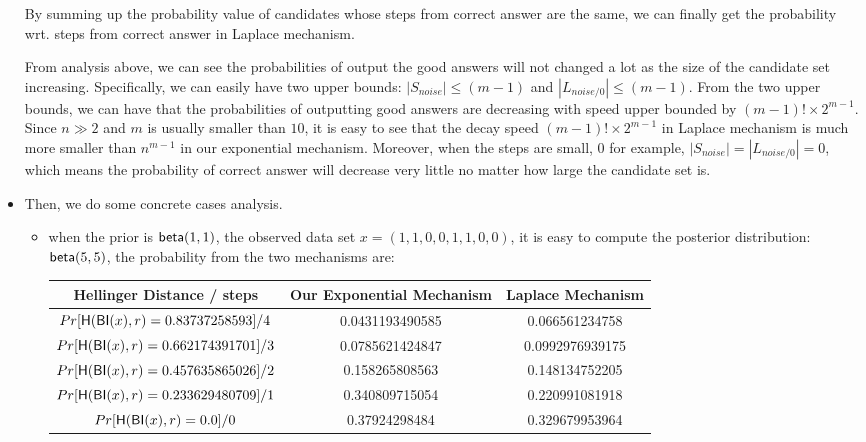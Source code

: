 \begin{itemize}
	By summing up the probability value of candidates whose steps from correct answer are the same, we can finally get the probability wrt. steps from correct answer in Laplace mechanism.

	From analysis above, we can see the probabilities of output the good answers will not changed a lot as the size of the candidate set increasing. Specifically, we can easily have two upper bounds: $|S_{noise}| \leq (m-1)$ and $|L_{noise/0}| \leq (m-1)$. From the two upper bounds, we can have that the probabilities of outputting good answers are decreasing with speed upper bounded by $(m-1)! \times 2^{m-1}$. Since $n \gg 2$ and $m$ is usually smaller than $10$, it is easy to see that the decay speed $(m-1)! \times 2^{m-1}$ in Laplace mechanism is much more smaller than $n^{m-1}$ in our exponential mechanism. Moreover, when the steps are small, $0$ for example, $|S_{noise}| = |L_{noise/0}|  = 0$, which means the probability of correct answer will decrease very little no matter how large the candidate set is. 

	\item Then, we do some concrete cases analysis.

	\begin{itemize}

		\item when the prior is $\mathsf{beta}(1,1)$, the observed data set $x = (1,1,0,0,1,1,0,0)$, it is easy to compute the posterior distribution: $\mathsf{beta}(5,5)$, the probability from the two mechanisms are: 

		\begin{center}
		 \begin{tabular}{c | c | c} 
		 \hline
		 Hellinger Distance / steps & Our Exponential Mechanism & Laplace Mechanism  \\
		 \hline\hline
		 $Pr[\mathsf{H}(\mathsf{BI}(x), r) = 0.83737258593] / 4		$ & 0.0431193490585 & 0.066561234758\\ 
		 \hline
		 $Pr[\mathsf{H}(\mathsf{BI}(x), r) = 0.662174391701 ] / 3	$ & 0.0785621424847 & 0.0992976939175  \\
		 \hline
		 $Pr[\mathsf{H}(\mathsf{BI}(x), r) = 0.457635865026 ] / 2	$ & 0.158265808563 & 0.148134752205  \\
		 \hline
		 $Pr[\mathsf{H}(\mathsf{BI}(x), r) = 0.233629480709 ] / 1	$ & 0.340809715054 & 0.220991081918  \\
		 \hline
		 $Pr[\mathsf{H}(\mathsf{BI}(x), r) = 0.0 ] / 0 				$ & 0.37924298484 & 0.329679953964 \\
		 \hline
		\end{tabular}
		\end{center}


\end{itemize}
\end{itemize}
